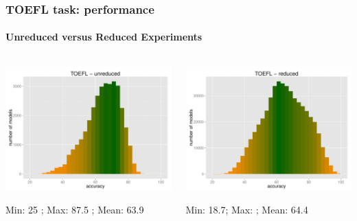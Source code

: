 \documentclass[t]{beamer} %
\begin{document}
\begin{frame}
  \frametitle{TOEFL task: performance}
  \framesubtitle{Unreduced versus Reduced Experiments}
  \centering
  
  \begin{columns}

    \begin{column}{0.5\textwidth}
      \centering
      \hspace*{-18pt}   \includegraphics[scale=0.30]{img/lapesa_hist_toefl_unreduced}
      \begin{block}{}\footnotesize \centering
        Min:  25 ; Max: 87.5 ;  Mean: 63.9
      \end{block}
    \end{column}
    \begin{column}{0.5\textwidth}
      \hspace*{-18pt} 
      \includegraphics[scale=0.30]{img/lapesa_hist_toefl_reduced}
      \begin{block}{}\footnotesize \centering
        Min:  18.7; Max: ;  Mean: 64.4
      \end{block}
    \end{column}
  \end{columns}
\end{frame}
\end{document}
